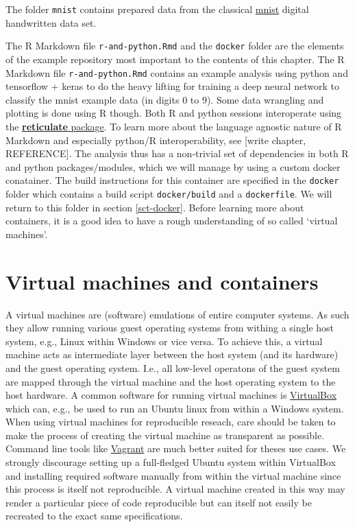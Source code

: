 \documentclass[]{book}
\begin{document}
The folder \texttt{mnist} contains prepared data from the classical
\href{http://yann.lecun.com/exdb/mnist/}{mnist} digital handwritten data
set.

The R Markdown file \texttt{r-and-python.Rmd} and the \texttt{docker}
folder are the elements of the example repository most important to the
contents of this chapter. The R Markdown file \texttt{r-and-python.Rmd}
contains an example analysis using python and tensorflow + keras to do
the heavy lifting for training a deep neural network to classify the
mnist example data (in digits 0 to 9). Some data wrangling and plotting
is done using R though. Both R and python sessions interoperate using
the \href{https://github.com/rstudio/reticulate}{\textbf{reticulate}
package}. To learn more about the language agnostic nature of R Markdown
and especially python/R interoperability, see {[}write chapter,
REFERENCE{]}. The analysis thus has a non-trivial set of dependencies in
both R and python packages/modules, which we will manage by using a
custom docker conatainer. The build instructions for this container are
specified in the \texttt{docker} folder which contains a build script
\texttt{docker/build} and a \texttt{dockerfile}. We will return to this
folder in section \ref{sct-docker}. Before learning more about
containers, it is a good idea to have a rough understanding of so called
`virtual machines'.

\section{Virtual machines and
containers}\label{virtual-machines-and-containers}

A virtual machines are (software) emulations of entire computer systems.
As such they allow running various guest operating systems from withing
a single host system, e.g., Linux within Windows or vice versa. To
achieve this, a virtual machine acts as intermediate layer between the
host system (and its hardware) and the guest operating system. I.e., all
low-level operatons of the guest system are mapped through the virtual
machine and the host operating system to the host hardware. A common
software for running virtual machines is
\href{https://www.virtualbox.org/}{VirtualBox} which can, e.g., be used
to run an Ubuntu linux from within a Windows system. When using virtual
machines for reproducible reseach, care should be taken to make the
process of creating the virtual machine as transparent as possible.
Command line tools like \href{https://www.vagrantup.com/}{Vagrant} are
much better suited for theses use cases. We strongly discourage setting
up a full-fledged Ubuntu system within VirtualBox and installing
required software manually from within the virtual machine since this
process is itself not reproducible. A virtual machine created in this
way may render a particular piece of code reproducible but can itself
not easily be recreated to the exact same specifications.
\end{document}
